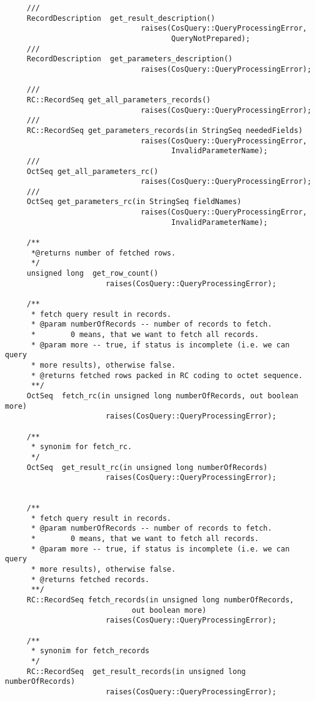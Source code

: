 \documentclass[10pt]{article}
\begin{document}
\begin{verbatim}
     ///
     RecordDescription  get_result_description() 
                               raises(CosQuery::QueryProcessingError, 
                                      QueryNotPrepared);
     ///
     RecordDescription  get_parameters_description()
                               raises(CosQuery::QueryProcessingError);

     ///
     RC::RecordSeq get_all_parameters_records() 
                               raises(CosQuery::QueryProcessingError);
     ///
     RC::RecordSeq get_parameters_records(in StringSeq neededFields)
                               raises(CosQuery::QueryProcessingError,
                                      InvalidParameterName);
     ///
     OctSeq get_all_parameters_rc() 
                               raises(CosQuery::QueryProcessingError);
     ///
     OctSeq get_parameters_rc(in StringSeq fieldNames)
                               raises(CosQuery::QueryProcessingError,
                                      InvalidParameterName);

     /**
      *@returns number of fetched rows.
      */
     unsigned long  get_row_count() 
                       raises(CosQuery::QueryProcessingError);
     
     /**
      * fetch query result in records.
      * @param numberOfRecords -- number of records to fetch.
      *        0 means, that we want to fetch all records.
      * @param more -- true, if status is incomplete (i.e. we can query
      * more results), otherwise false.
      * @returns fetched rows packed in RC coding to octet sequence.
      **/
     OctSeq  fetch_rc(in unsigned long numberOfRecords, out boolean more)
                       raises(CosQuery::QueryProcessingError);

     /**
      * synonim for fetch_rc.
      */
     OctSeq  get_result_rc(in unsigned long numberOfRecords)
                       raises(CosQuery::QueryProcessingError);


     /**
      * fetch query result in records.
      * @param numberOfRecords -- number of records to fetch.
      *        0 means, that we want to fetch all records.
      * @param more -- true, if status is incomplete (i.e. we can query
      * more results), otherwise false.
      * @returns fetched records.
      **/
     RC::RecordSeq fetch_records(in unsigned long numberOfRecords, 
                             out boolean more)
                       raises(CosQuery::QueryProcessingError);

     /**
      * synonim for fetch_records
      */
     RC::RecordSeq  get_result_records(in unsigned long numberOfRecords)
                       raises(CosQuery::QueryProcessingError);


\end{verbatim}
\end{document}
